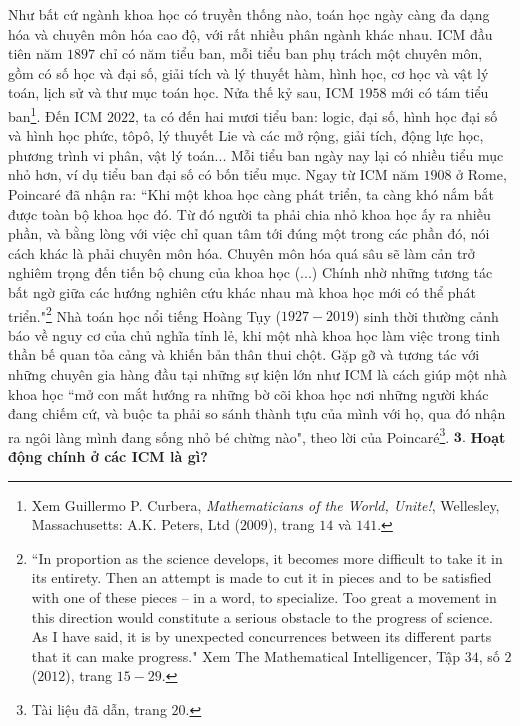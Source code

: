 \begin{multicols}{2}
	\vskip 0.1cm
	Như bất cứ ngành khoa học có truyền thống nào, toán học ngày càng đa dạng hóa và chuyên môn hóa cao độ, với rất nhiều phân ngành khác nhau. ICM đầu tiên năm $1897$ chỉ có năm tiểu ban, mỗi tiểu ban phụ trách một chuyên môn, gồm có số học và đại số, giải tích và lý thuyết hàm, hình học, cơ học và vật lý toán, lịch sử và thư mục toán học. Nửa thế kỷ sau, ICM $1958$ mới có tám tiểu ban\footnote{\color{doisongtoanhoc}Xem Guillermo P. Curbera, \emph{Mathematicians of the World, Unite!}, Wellesley, Massachusetts: A.K. Peters, Ltd ($2009$), trang $14$ và $141$.}. Đến ICM $2022$, ta có đến hai mươi tiểu ban: logic, đại số, hình học đại số và hình học phức, tôpô, lý thuyết Lie và các mở rộng, giải tích, động lực học, phương trình vi phân, vật lý toán... Mỗi tiểu ban ngày nay lại có nhiều tiểu mục nhỏ hơn, ví dụ tiểu ban đại số có bốn tiểu mục.  Ngay từ ICM năm $1908$ ở Rome, Poincar\'e đã nhận ra: ``Khi một khoa học càng phát triển, ta càng khó nắm bắt được toàn bộ khoa học đó. Từ đó người ta phải chia nhỏ khoa học ấy ra nhiều phần, và bằng lòng với việc chỉ quan tâm tới đúng một trong các phần đó, nói cách khác là phải chuyên môn hóa. Chuyên môn hóa quá sâu sẽ làm cản trở nghiêm trọng đến tiến bộ chung của khoa học (...) Chính nhờ những tương tác bất ngờ giữa các hướng nghiên cứu khác nhau mà khoa học mới có thể phát triển."\footnote{\color{doisongtoanhoc}``In proportion as the science develops, it becomes more difficult to take it in its entirety. Then an attempt is made to
		cut it in pieces and to be satisfied with one of these pieces -- in
		a word, to specialize. Too great a movement in this direction
		would constitute a serious obstacle to the progress of science. As I have said, it is by unexpected concurrences
		between its different parts that it can make progress." Xem The Mathematical Intelligencer, Tập $34$, số $2$ ($2012$), trang $15-29$.} Nhà toán học nổi tiếng Hoàng Tụy ($1927-2019$) sinh thời thường cảnh báo về nguy cơ của chủ nghĩa tỉnh lẻ, khi một nhà khoa học làm việc trong tinh thần bế quan tỏa cảng và khiến bản thân thui chột. Gặp gỡ và tương tác với những chuyên gia hàng đầu tại những sự kiện lớn như ICM là cách giúp một nhà khoa học ``mở con mắt hướng ra những bờ cõi khoa học nơi những người khác đang chiếm cứ, và buộc ta phải so sánh thành tựu của mình với họ, qua đó nhận ra ngôi làng mình đang sống nhỏ bé chừng nào", theo lời của Poincar\'e\footnote{\color{doisongtoanhoc}Tài liệu đã dẫn, trang $20$.}.
	\vskip 0.1cm
	$\pmb{3.}$ \textbf{\color{doisongtoanhoc}Hoạt động chính ở các ICM là gì?}
	\vskip 0.1cm

\end{multicols}
